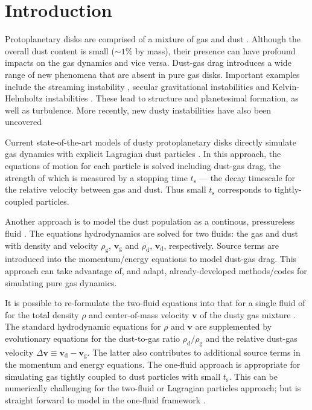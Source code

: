 \documentclass[iop, numberedappendix]{emulateapj}
\newcommand{\rhod}{\rho_\mathrm{d}}
\newcommand{\rhog}{\rho_\mathrm{g}}
\newcommand{\tstop}{t_\mathrm{s}}
\begin{document}
\section{Introduction}
Protoplanetary disks are comprised of a mixture of gas and dust
\citep{chiang10}. Although the overall dust content is small
($\sim 1\%$ by mass), their presence can have profound impacts on the 
gas dynamics and vice versa. Dust-gas drag introduces a 
wide range of new phenomena that are absent in pure gas
disks. Important examples include the streaming instability
\citep{youdin05a,youdin07b,johansen07}, secular gravitational
instabilities \citep{ward00,youdin11,michikoshi12,takahashi14} and
Kelvin-Helmholtz instabilities
\citep{chiang08,barranco09,lee10}. These lead to structure and
planetesimal formation, as well as turbulence. More recently, new
dusty instabilities have also been uncovered
\citep{loren15,loren16,lamb16}  


Current state-of-the-art models of dusty protoplanetary
disks directly simulate gas dynamics with explicit
Lagragian dust particles \citep{nelson10,bai10,johansen11,yang14,zhu14,gibbons15,simon16,baruteau16}. In this
approach, the equations of motion for each particle is solved
including dust-gas drag, the strength of which is measured 
by a stopping time $\tstop$ --- the decay timescale for the 
relative velocity between gas and dust. Thus small $\tstop$
corresponds to tightly-coupled particles. 


Another approach is to model the dust population as a continous, pressureless
fluid
\citep{paardekooper06b,meheut12,laibe12,loren14,fu14b,surville16}. The equations
hydrodynamics are solved for two fluids: the gas and dust with density and
velocity $\rhog$, $\bm{v}_\mathrm{g}$ and $\rhod$,
$\bm{v}_\mathrm{d}$, respectively. Source terms are introduced into
the momentum/energy equations to model dust-gas drag. This approach
can take advantage of, and adapt, already-developed methods/codes for
simulating pure gas dynamics. 


It is possible to re-formulate the two-fluid equations into that for a
single fluid of for the total density $\rho$ and center-of-mass
velocity $\bm{v}$ of the dusty gas mixture
\citep{laibe14}. The standard hydrodynamic equations for
$\rho$ and $\bm{v}$ are supplemented by evolutionary equations for
the dust-to-gas ratio $\rhod/\rhog$ and the relative dust-gas velocity
$\Delta\bm{v}\equiv \bm{v}_\mathrm{d}-\bm{v}_\mathrm{g}$. The latter also contributes to 
additional source terms in the momentum and energy equations.  
The one-fluid approach is appropriate for 
simulating gas tightly coupled to dust particles with small $\tstop$.  
This can be numerically challenging for the two-fluid or Lagragian
particles approach; but is straight forward to model in the
one-fluid framework \citep{price15}.  
\end{document}
